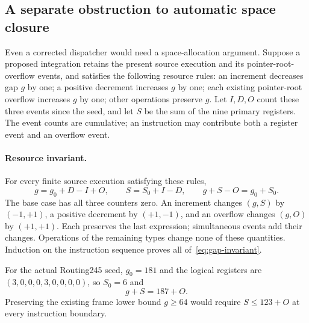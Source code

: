 \subsection{A separate obstruction to automatic space closure}

Even a corrected dispatcher would need a space-allocation argument.
Suppose a proposed integration retains the present source execution and
its pointer-root-overflow events, and satisfies the following resource
rules: an increment decreases gap $g$ by one; a positive decrement
increases $g$ by one; each existing pointer-root overflow increases $g$
by one; other operations preserve $g$.  Let $I,D,O$ count these three
events since the seed, and let $S$ be the sum of the nine primary
registers.  The event counts are cumulative; an instruction may contribute
both a register event and an overflow event.

\paragraph{Resource invariant.}
For every finite source execution satisfying these rules,
\begin{equation}
 g=g_0+D-I+O,\qquad S=S_0+I-D,
 \qquad g+S-O=g_0+S_0.\label{eq:gap-invariant}
\end{equation}
The base case has all three counters zero.  An increment changes
$(g,S)$ by $(-1,+1)$, a positive decrement by $(+1,-1)$, and an overflow
changes $(g,O)$ by $(+1,+1)$.  Each preserves the last expression;
simultaneous events add their changes.  Operations of the remaining
types change none of these quantities.  Induction on the instruction
sequence proves all of~\eqref{eq:gap-invariant}.

For the actual Routing245 seed, $g_0=181$ and
the logical registers are $(3,0,0,0,3,0,0,0,0)$, so $S_0=6$ and
\begin{equation}
 g+S=187+O.\label{eq:seed-gap-invariant}
\end{equation}
Preserving the existing frame lower bound $g\ge64$ would require
$S\le123+O$ at every instruction boundary.

